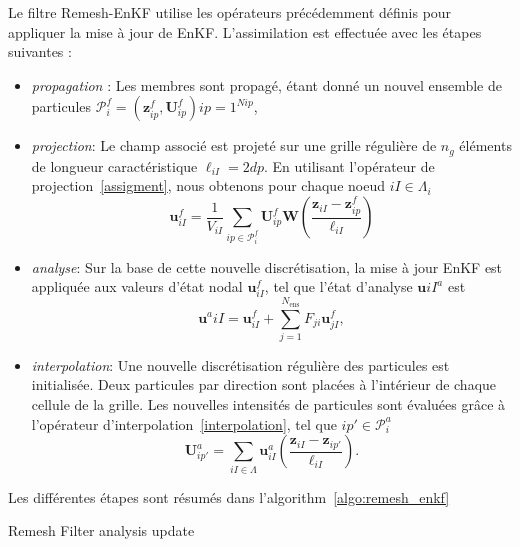 Le filtre Remesh-EnKF utilise les opérateurs précédemment définis pour appliquer la mise à jour de EnKF. L'assimilation est effectuée avec les étapes suivantes :

\begin{itemize}
\begin{itemize}
    \item \textit{propagation} : Les membres sont propagé, étant donné un nouvel ensemble de particules $\mathcal{P}^f_i = {(\bm z^f_{ip}, \bm U^f_{ip})}{ip = 1}^{N{ip}}$,
    \item \textit{projection}: Le champ associé est projeté sur une grille régulière de $n_g$ éléments de longueur caractéristique $\ell_{iI}= 2dp$. En utilisant l'opérateur de projection~\ref{assigment}, nous obtenons pour chaque noeud $iI \in \Lambda_{i}$
          \begin{equation*}
              \bm{u}^f_{iI} = \frac1{V_{iI}} \sum_{ip \in \mathcal P^f_i} \bm U^f_{ip} \bm W \left(\frac{\bm z_{iI} - \bm z^f_{ip}}{\ell_{iI}} \right)
          \end{equation*}
    \item \textit{analyse}: Sur la base de cette nouvelle discrétisation, la mise à jour EnKF est appliquée aux valeurs d'état nodal $\bm{u}^f_{iI}$, tel que l'état d'analyse $\bm{u}{iI}^a$ est
          \begin{equation*}
              \bm{u}^a{iI} = \bm{u}^f_{iI} + \sum_{j=1}^{N_{\text{ens}}} F_{ji} \bm{u}^f_{jI},
          \end{equation*}
    \item \textit{interpolation}: Une nouvelle discrétisation régulière des particules est initialisée. Deux particules par direction sont placées à l'intérieur de chaque cellule de la grille. Les nouvelles intensités de particules sont évaluées grâce à l'opérateur d'interpolation~\ref{interpolation}, tel que $ip' \in \mathcal P_i^a$
          \begin{equation*}
              \bm U_{ip'}^a = \sum_{iI \in \Lambda} \bm u^a_{iI} \left(\frac{\bm z_{iI} - \bm z_{ip'}}{\ell_{iI}} \right).
          \end{equation*}
\end{itemize}

Les différentes étapes sont résumés dans l'algorithm~\ref{algo:remesh_enkf}

\begin{algorithm}

    \caption{Remesh Filter analysis update}~\label{algo:remesh_enkf}


\end{algorithm}
\end{itemize}
